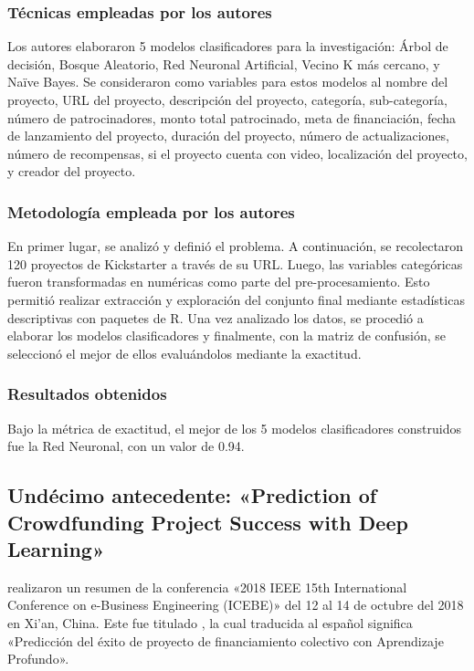 \subsubsection{Técnicas empleadas por los autores}
Los autores elaboraron 5 modelos clasificadores para la investigación: Árbol de decisión, Bosque Aleatorio, Red Neuronal Artificial, Vecino K más cercano, y Naïve Bayes. Se consideraron como variables para estos modelos al nombre del proyecto, URL del proyecto, descripción del proyecto, categoría, sub-categoría, número de patrocinadores, monto total patrocinado, meta de financiación, fecha de lanzamiento del proyecto, duración del proyecto, número de actualizaciones, número de recompensas, si el proyecto cuenta con video, localización del proyecto, y creador del proyecto.

\subsubsection{Metodología empleada por los autores}
En primer lugar, se analizó y definió el problema. A continuación, se recolectaron 120 proyectos de Kickstarter a través de su URL. Luego, las variables categóricas fueron transformadas en numéricas como parte del pre-procesamiento. Esto permitió realizar extracción y exploración del conjunto final mediante estadísticas descriptivas con paquetes de R. Una vez analizado los datos, se procedió a elaborar los modelos clasificadores y finalmente, con la matriz de confusión, se seleccionó el mejor de ellos evaluándolos mediante la exactitud.

\subsubsection{Resultados obtenidos}
Bajo la métrica de exactitud, el mejor de los 5 modelos clasificadores construidos fue la Red Neuronal, con un valor de 0.94.

\subsection{Undécimo antecedente: «Prediction of Crowdfunding Project Success with Deep Learning» \citep*{pr_yu2018deeplearning}}
\citeauthor{pr_yu2018deeplearning} realizaron un resumen de la conferencia «2018 IEEE 15th International Conference on e-Business Engineering (ICEBE)» del 12 al 14 de octubre del 2018 en Xi'an, China. Este fue titulado , la cual traducida al español significa «Predicción del éxito de proyecto de financiamiento colectivo con Aprendizaje Profundo».

